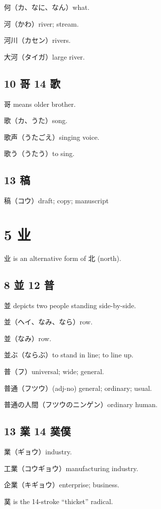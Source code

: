 何（カ、なに、なん）what.

河（かわ）river; stream.

河川（カセン）rivers.

大河（タイガ）large river.

\subsection{10 哥 14 歌}

哥 means older brother.

歌（カ、うた）song.

歌声（うたごえ）singing voice.

歌う（うたう）to sing.

\subsection{13 稿}

稿（コウ）draft; copy; manuscript

\section{5 业}

业 is an alternative form of 北 (north).

\subsection{8 並 12 普}

並 depicts two people standing side-by-side.

並（ヘイ、なみ、なら）row.

並（なみ）row.

並ぶ（ならぶ）to stand in line; to line up.

普（フ）universal; wide; general.

普通（フツウ）(adj-no) general; ordinary; usual.

普通の人間（フツウのニンゲン）ordinary human.

\subsection{13 業 14 菐僕}

業（ギョウ）industry.

工業（コウギョウ）manufacturing industry.

企業（キギョウ）enterprise; business.

菐 is the 14-stroke ``thicket'' radical.

